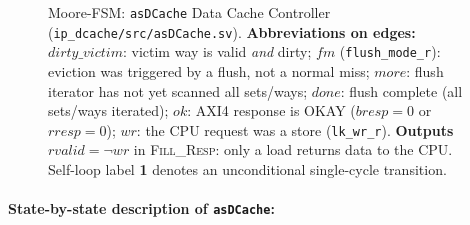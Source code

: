 \begin{figure}[H]
{
}%
\caption{Moore-FSM: \texttt{asDCache} Data Cache Controller
  (\texttt{ip\_dcache/src/asDCache.sv}).
  \textbf{Abbreviations on edges:}
  $\mathit{dirty\_victim}$: victim way is valid \emph{and} dirty;
  $\mathit{fm}$ (\texttt{flush\_mode\_r}): eviction was triggered by a
  flush, not a normal miss;
  $\mathit{more}$: flush iterator has not yet scanned all sets/ways;
  $\mathit{done}$: flush complete (all sets/ways iterated);
  $\mathit{ok}$: AXI4 response is OKAY ($\mathit{bresp}{=}0$ or
  $\mathit{rresp}{=}0$);
  $\mathit{wr}$: the CPU request was a store (\texttt{lk\_wr\_r}).
  \textbf{Outputs} $\mathit{rvalid}{=}{\neg}\mathit{wr}$ in
  \textsc{Fill\_Resp}: only a load returns data to the CPU.
  Self-loop label \textbf{1} denotes an unconditional single-cycle
  transition.}
\label{fig:asDCacheFsm01}
\end{figure}

\paragraph{State-by-state description of \texttt{asDCache}:}

